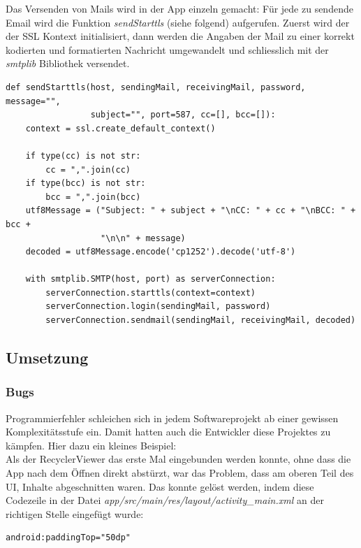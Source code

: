 \documentclass[a4paper,11pt]{article}
\begin{document}
Das Versenden von Mails wird in der App einzeln gemacht: Für jede zu sendende Email wird die Funktion \textit{sendStarttls} (siehe folgend) aufgerufen. Zuerst wird der der SSL Kontext initialisiert, dann werden die Angaben der Mail zu einer korrekt kodierten und formatierten Nachricht umgewandelt und schliesslich mit der \textit{smtplib} Bibliothek versendet.

\lstset{language=python}
\begin{lstlisting}
def sendStarttls(host, sendingMail, receivingMail, password, message="",
                 subject="", port=587, cc=[], bcc=[]):
    context = ssl.create_default_context()

    if type(cc) is not str:
        cc = ",".join(cc)
    if type(bcc) is not str:
        bcc = ",".join(bcc)
    utf8Message = ("Subject: " + subject + "\nCC: " + cc + "\nBCC: " + bcc +
                   "\n\n" + message)
    decoded = utf8Message.encode('cp1252').decode('utf-8')

    with smtplib.SMTP(host, port) as serverConnection:
        serverConnection.starttls(context=context)
        serverConnection.login(sendingMail, password)
        serverConnection.sendmail(sendingMail, receivingMail, decoded)
\end{lstlisting}

\subsection{Umsetzung}
\subsubsection{Bugs}
Programmierfehler schleichen sich in jedem Softwareprojekt ab einer gewissen Komplexitätsstufe ein. Damit hatten auch die Entwickler diese Projektes zu kämpfen. Hier dazu ein kleines Beispiel:\\

Als der RecyclerViewer das erste Mal eingebunden werden konnte, ohne dass die App nach dem Öffnen direkt abstürzt, war das Problem, dass am oberen Teil des UI, Inhalte abgeschnitten waren. Das konnte gelöst werden, indem diese Codezeile in der Datei \textit{app/src/main/res/layout/activity\_main.xml} an der richtigen Stelle eingefügt wurde:

\lstset{language=XML}
\begin{lstlisting}
android:paddingTop="50dp"
\end{lstlisting}
\end{document}

